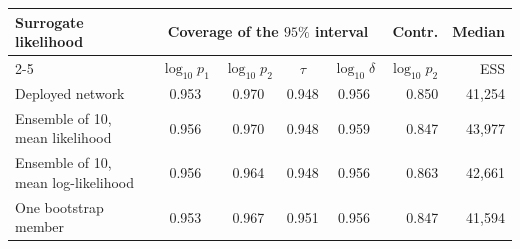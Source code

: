 \begin{tabular}{lccccrr}
\toprule
Surrogate likelihood & \multicolumn{4}{c}{Coverage of the $95\%$ interval} & Contr. & Median \\
\cmidrule(lr){2-5}
 & $\log_{10}p_1$ & $\log_{10}p_2$ & $\tau$ & $\log_{10}\delta$ & $\log_{10}p_2$ & ESS \\
\midrule
Deployed network & 0.953 & 0.970 & 0.948 & 0.956 & 0.850 & 41{,}254 \\
Ensemble of 10, mean likelihood & 0.956 & 0.970 & 0.948 & 0.959 & 0.847 & 43{,}977 \\
Ensemble of 10, mean log-likelihood & 0.956 & 0.964 & 0.948 & 0.956 & 0.863 & 42{,}661 \\
One bootstrap member & 0.953 & 0.967 & 0.951 & 0.956 & 0.847 & 41{,}594 \\
\bottomrule
\end{tabular}
